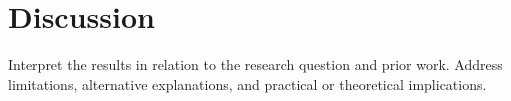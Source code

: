 \chapter{Discussion}

Interpret the results in relation to the research question and prior work.
Address limitations, alternative explanations, and practical or theoretical
implications.
